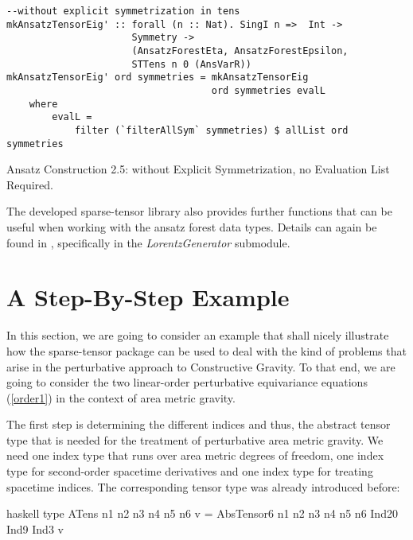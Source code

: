 \begin{listing}[hbt!]
\begin{verbatim}
--without explicit symmetrization in tens
mkAnsatzTensorEig' :: forall (n :: Nat). SingI n =>  Int ->
                      Symmetry ->
                      (AnsatzForestEta, AnsatzForestEpsilon,
                      STTens n 0 (AnsVarR))
mkAnsatzTensorEig' ord symmetries = mkAnsatzTensorEig
                                    ord symmetries evalL
    where
        evalL =
            filter (`filterAllSym` symmetries) $ allList ord symmetries
\end{verbatim} 
\caption{Ansatz Construction 2.5: without Explicit Symmetrization, no Evaluation List Required.}\label{mkAnsatzEig2'}
\end{listing}

The developed sparse-tensor library also provides further functions that can be useful when working with the ansatz forest data types. Details can again be found in \cite{sparse-tensor}, specifically in the \textit{LorentzGenerator} submodule. 

\section{A Step-By-Step Example}
In this section, we are going to consider an example that shall nicely illustrate how the sparse-tensor package can be used to deal with the kind of problems that arise in the perturbative approach to Constructive Gravity. To that end, we are going to consider the two linear-order perturbative equivariance equations (\ref{order1}) in the context of area metric gravity. 

The first step is determining the different indices and thus, the abstract tensor type that is needed for the treatment of perturbative area metric gravity. 
We need one index type that runs over area metric degrees of freedom, one index type for second-order spacetime derivatives and one index type for treating spacetime indices. The corresponding tensor type was already introduced before:

\begin{center}
\begin{cminted}{haskell}
type ATens n1 n2 n3 n4 n5 n6 v = 
     AbsTensor6 n1 n2 n3 n4 n5 n6 Ind20 Ind9 Ind3 v
\end{cminted}
\end{center}

